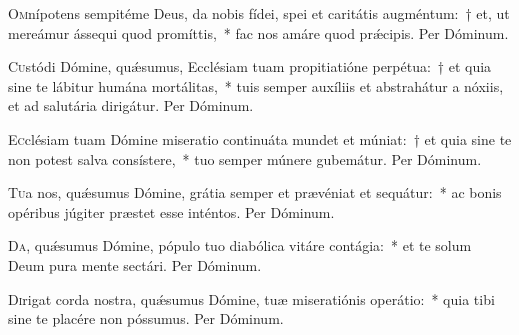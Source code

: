 \documentclass[vesperale_romanum.tex]{subfiles}
\begin{document}


\oratio

\lettrine{O}{m}nípotens sempitéme Deus, da nobis fídei, spei et caritátis augméntum:~† et, ut mereámur ássequi quod promíttis,~* fac nos amáre quod prǽcipis. Per Dóminum.



\oratio

\lettrine{C}{u}stódi Dómine, quǽsumus, Ecclésiam tuam propitiatióne perpétua:~† et quia sine te lábitur humána mortálitas,~* tuis semper auxíliis et abstrahátur a nóxiis, et ad salutária dirigátur. Per Dóminum. 



\oratio

\lettrine{E}{c}clésiam tuam Dómine miseratio continuáta mundet et múniat:~† et quia sine te non potest salva consístere,~* tuo semper múnere gubemátur. Per Dóminum.



\oratio

\lettrine{T}{u}a nos, quǽsumus Dómine, grátia semper et prævéniat et sequátur:~* ac bonis opéribus júgiter præstet esse inténtos.
Per Dóminum.


\oratio

\lettrine{D}{a}, quǽsumus Dómine, pópulo tuo diabólica vitáre contágia:~* et te solum Deum pura mente sectári. Per Dóminum.



\oratio

\lettrine{D}{i}rigat corda nostra, quǽsumus Dómine, tuæ miseratiónis operátio:~* quia tibi sine te placére non póssumus. Per Dóminum.

\end{document}
